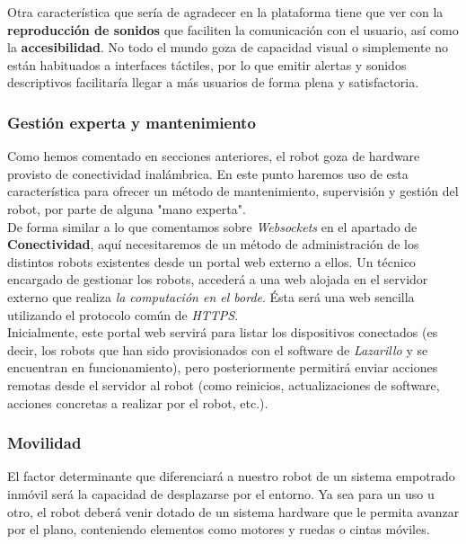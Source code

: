 Otra característica que sería de agradecer en la plataforma tiene que ver con la \textbf{reproducción de sonidos} que faciliten la comunicación con el usuario, así como la \textbf{accesibilidad}. No todo el mundo goza de capacidad visual o simplemente no están habituados a interfaces táctiles, por lo que emitir alertas y sonidos descriptivos facilitaría llegar a más usuarios de forma plena y satisfactoria.

\subsubsection{Gestión experta y mantenimiento}

Como hemos comentado en secciones anteriores, el robot goza de hardware provisto de conectividad inalámbrica. En este punto haremos uso de esta característica para ofrecer un método de mantenimiento, supervisión y gestión del robot, por parte de alguna "mano experta".\\

De forma similar a lo que comentamos sobre \textit{Websockets} en el apartado de \textbf{Conectividad}, aquí necesitaremos de un método de administración de los distintos robots existentes desde un portal web externo a ellos. Un técnico encargado de gestionar los robots, accederá a una web alojada en el servidor externo que realiza \textit{la computación en el borde}. Ésta será una web sencilla utilizando el protocolo común de \textit{HTTPS}.\\

Inicialmente, este portal web servirá para listar los dispositivos conectados (es decir, los robots que han sido provisionados con el software de \textit{Lazarillo} y se encuentran en funcionamiento), pero posteriormente permitirá enviar acciones remotas desde el servidor al robot (como reinicios, actualizaciones de software, acciones concretas a realizar por el robot, etc.).

\subsubsection{Movilidad}

El factor determinante que diferenciará a nuestro robot de un sistema empotrado inmóvil será la capacidad de desplazarse por el entorno. Ya sea para un uso u otro, el robot deberá venir dotado de un sistema hardware que le permita avanzar por el plano, conteniendo elementos como motores y ruedas o cintas móviles.\\

